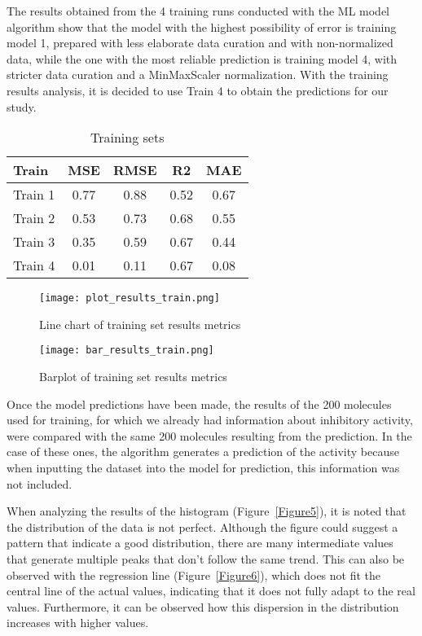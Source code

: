\documentclass[final,times,twocolumn,article]{elsarticle}
\begin{document}
The results obtained from the 4 training runs conducted with the ML model algorithm show that the model with the highest possibility of error is training model 1, prepared with less elaborate data curation and with non-normalized data, while the one with the most reliable prediction is training model 4, with stricter data curation and a MinMaxScaler normalization. With the training results analysis, it is decided to use Train 4 to obtain the predictions for our study. 

\begin{table}[ht]
    \centering
    \begin{tabular}{l c c c c} 
         \hline
         Train & MSE & RMSE & R2 & MAE\\ 
         \hline
         Train 1 & 0.77 & 0.88 & 0.52 & 0.67\\
         \hline
         Train 2 & 0.53 & 0.73 & 0.68 & 0.55\\
         \hline
         Train 3 & 0.35 & 0.59 & 0.67 & 0.44\\ 
         \hline
         Train 4 & 0.01 & 0.11 & 0.67 & 0.08\\ 
         \hline
        \end{tabular}
    \caption{Training sets}
    \label{Table2}
    \end{table}
 
 \begin{figure}[ht]
     \centering 
      \texttt{[image: plot\_results\_train.png]}	
      \caption{Line chart of training set results metrics} 
      \label{Figure3}
  \end{figure}
 
  \begin{figure}[ht]
     \centering 
      \texttt{[image: bar\_results\_train.png]}	
      \caption{Barplot of training set results metrics} 
      \label{Figure4}
  \end{figure}

Once the model predictions have been made, the results of the 200 molecules used for training, for which we already had information about inhibitory activity, were compared with the same 200 molecules resulting from the prediction. In the case of these ones, the algorithm generates a prediction of the activity because when inputting the dataset into the model for prediction, this information was not included. 

When analyzing the results of the histogram (Figure~\ref{Figure5}), it is noted that the distribution of the data is not perfect. Although the figure could suggest a pattern that indicate a good distribution, there are many intermediate values that generate multiple peaks that don't follow the same trend. This can also be observed with the regression line (Figure~\ref{Figure6}), which does not fit the central line of the actual values, indicating that it does not fully adapt to the real values. Furthermore, it can be observed how this dispersion in the distribution increases with higher values. 
\end{document}
